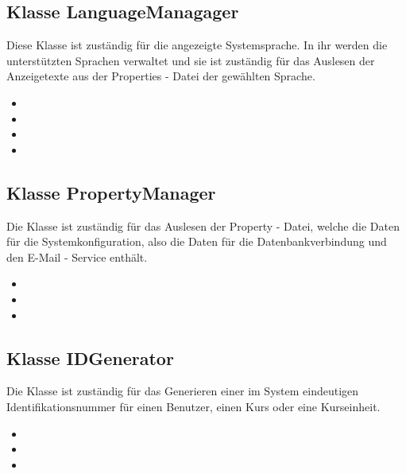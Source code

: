 \documentclass[a4paper]{scrreprt}
\begin{document}
	\subsection{Klasse LanguageManagager}
	Diese Klasse ist zuständig für die angezeigte Systemsprache. In ihr werden die unterstützten Sprachen verwaltet und sie ist zuständig für das Auslesen der Anzeigetexte aus der Properties - Datei der gewählten Sprache.
	\begin{itemize}
		\item {}
		\item {}
		\item {}
		\item {}
	\end{itemize}
	
	\subsection{Klasse PropertyManager}
	Die Klasse ist zuständig für das Auslesen der Property - Datei, welche die Daten für die Systemkonfiguration, also die Daten für die Datenbankverbindung und den E-Mail - Service enthält.
	\begin{itemize}
		\item {}
		\item {}
		\item {}
	\end{itemize}
	
	\subsection{Klasse IDGenerator}
	Die Klasse ist zuständig für das Generieren einer im System eindeutigen Identifikationsnummer für einen Benutzer, einen Kurs oder eine Kurseinheit.
	\begin{itemize}
		\item {}
		\item {}
		\item {}
	\end{itemize}
	
\end{document}
